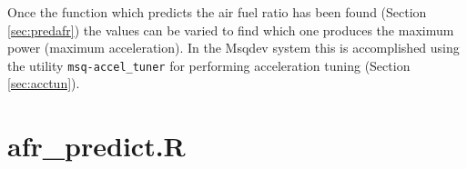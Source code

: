 \documentclass{article}
\begin{document}
Once the function which predicts the air fuel ratio has been found
(Section \ref{sec:predafr}) the values can be varied to find which
one produces the maximum power (maximum acceleration).
In the Msqdev system this is accomplished using the utility
\verb+msq-accel_tuner+ for performing acceleration tuning (Section \ref{sec:acctun}).

\appendix
\section{afr\_predict.R}
\label{app:afrpred}



\pagebreak


%
%
%

\end{document}
